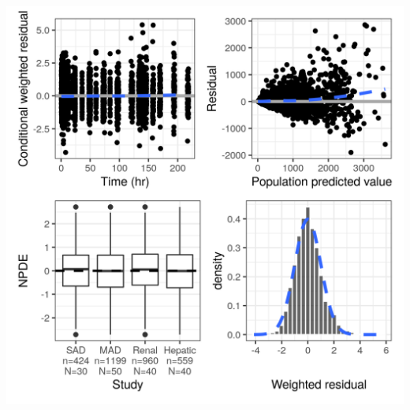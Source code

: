 \documentclass[portrait,fontscale=0.46,paperwidth=36in,paperheight=48in]{baposter}
\begin{document}
\begin{poster}
{\begin{minipage}[c]{0.333\linewidth}
\begin{demobx}[]
\begin{minipage}[c]{0.55\textwidth}
		\end{minipage}	
		\begin{minipage}[c]{0.5\textwidth} 
			\vspace{-6mm}
			\hspace{-6mm}
			\includegraphics[scale=0.5]{"images/res.png"}
		\end{minipage}

		\vspace{-3mm}
	\end{demobx}	
\end{minipage} %

\hspace{0.667\linewidth}
\begin{minipage}[c]{0.333\linewidth}
	\vspace{-21.45cm} %
	\begin{demobx}[]
		

\end{demobx}
\end{minipage}}
\end{poster}
\end{document}
